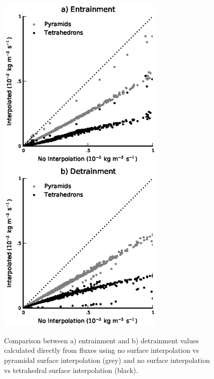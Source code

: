 \documentclass[12pt]{article}
\begin{document}
\begin{figure}[t]
  \noindent\includegraphics[width=19pc,angle=0]{./figures/effect_of_interpolation.eps}\\
  \caption{Comparison between a) entrainment and b) detrainment values 
calculated directly from fluxes using no surface interpolation vs pyramidal 
surface interpolation (grey) and no surface interpolation vs tetrahedral 
surface interpolation (black).}\label{fig:effect_of_interpolation}
\end{figure}
\end{document}
